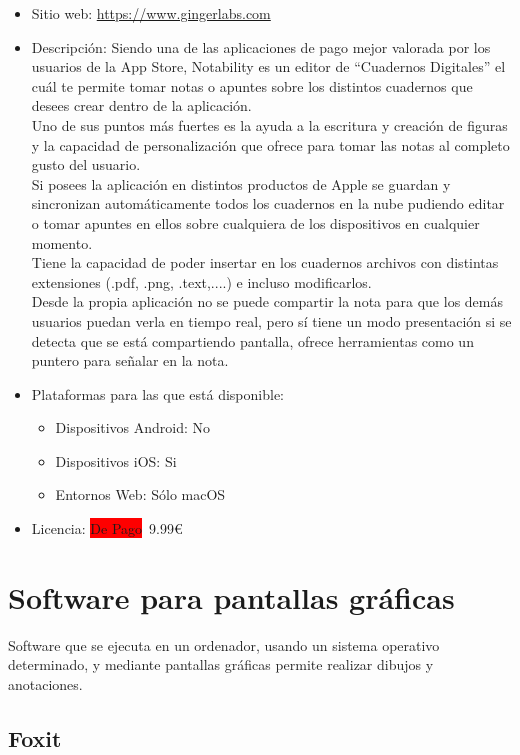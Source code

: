 \documentclass[11pt]{article}
\newcommand{\pago}{\colorbox{Red}{De Pago}}
\begin{document}
\begin{itemize}
\item Sitio web: \url{https://www.gingerlabs.com}
\item Descripción: Siendo una de las aplicaciones de pago mejor valorada por los usuarios de la App Store, Notability es un editor de ``Cuadernos Digitales'' el cuál te permite tomar notas o apuntes sobre los distintos cuadernos que desees crear dentro de la aplicación. 
\\
Uno de sus puntos más fuertes es la ayuda a la escritura y creación de figuras y la capacidad de personalización que ofrece para tomar las notas al completo gusto del usuario.
\\
Si posees la aplicación en distintos productos de Apple se guardan y sincronizan automáticamente todos los cuadernos en la nube pudiendo editar o tomar apuntes en ellos sobre cualquiera de los dispositivos en cualquier momento.
\\
Tiene la capacidad de poder insertar en los cuadernos archivos con distintas extensiones (.pdf, .png, .text,....) e incluso modificarlos.
\\
Desde la propia aplicación no se puede compartir la nota para que los demás usuarios puedan verla en tiempo real, pero sí tiene un modo presentación si se detecta que se está compartiendo pantalla, ofrece herramientas como un puntero para señalar en la nota.
\item Plataformas para las que está disponible:
  \begin{itemize}
  \item Dispositivos Android: No
  \item Dispositivos iOS: Si
  \item Entornos Web: Sólo macOS
  \end{itemize}
\item Licencia: \pago  \ 9.99\euro
\end{itemize}

\newpage

\section{Software para pantallas gráficas}

Software que se ejecuta en un ordenador, usando un sistema operativo
determinado, y mediante pantallas gráficas permite realizar dibujos y
anotaciones.

\subsection{Foxit}
\end{document}
